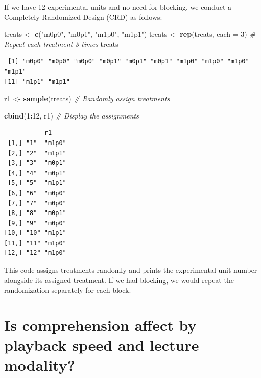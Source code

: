 \documentclass[
  letterpaper,
]{book}
\newenvironment{Shaded}{\begin{snugshade}}{\end{snugshade}}
\newcommand{\AttributeTok}[1]{\textcolor[rgb]{0.13,0.29,0.53}{#1}}
\newcommand{\CommentTok}[1]{\textcolor[rgb]{0.56,0.35,0.01}{\textit{#1}}}
\newcommand{\DecValTok}[1]{\textcolor[rgb]{0.00,0.00,0.81}{#1}}
\newcommand{\FunctionTok}[1]{\textcolor[rgb]{0.13,0.29,0.53}{\textbf{#1}}}
\newcommand{\NormalTok}[1]{#1}
\newcommand{\OtherTok}[1]{\textcolor[rgb]{0.56,0.35,0.01}{#1}}
\newcommand{\SpecialCharTok}[1]{\textcolor[rgb]{0.81,0.36,0.00}{\textbf{#1}}}
\newcommand{\StringTok}[1]{\textcolor[rgb]{0.31,0.60,0.02}{#1}}
\begin{document}
If we have 12 experimental units and no need for blocking, we conduct a
Completely Randomized Design (CRD) as follows:

\begin{Shaded}
\begin{Highlighting}[]
\NormalTok{treats }\OtherTok{\textless{}{-}} \FunctionTok{c}\NormalTok{(}\StringTok{"m0p0"}\NormalTok{, }\StringTok{"m0p1"}\NormalTok{, }\StringTok{"m1p0"}\NormalTok{, }\StringTok{"m1p1"}\NormalTok{)}
\NormalTok{treats }\OtherTok{\textless{}{-}} \FunctionTok{rep}\NormalTok{(treats, }\AttributeTok{each =} \DecValTok{3}\NormalTok{)  }\CommentTok{\# Repeat each treatment 3 times}
\NormalTok{treats }
\end{Highlighting}
\end{Shaded}

\begin{verbatim}
 [1] "m0p0" "m0p0" "m0p0" "m0p1" "m0p1" "m0p1" "m1p0" "m1p0" "m1p0" "m1p1"
[11] "m1p1" "m1p1"
\end{verbatim}

\begin{Shaded}
\begin{Highlighting}[]
\NormalTok{r1 }\OtherTok{\textless{}{-}} \FunctionTok{sample}\NormalTok{(treats)  }\CommentTok{\# Randomly assign treatments}

\FunctionTok{cbind}\NormalTok{(}\DecValTok{1}\SpecialCharTok{:}\DecValTok{12}\NormalTok{, r1)  }\CommentTok{\# Display the assignments}
\end{Highlighting}
\end{Shaded}

\begin{verbatim}
           r1    
 [1,] "1"  "m1p0"
 [2,] "2"  "m1p1"
 [3,] "3"  "m0p1"
 [4,] "4"  "m0p1"
 [5,] "5"  "m1p1"
 [6,] "6"  "m0p0"
 [7,] "7"  "m0p0"
 [8,] "8"  "m0p1"
 [9,] "9"  "m0p0"
[10,] "10" "m1p1"
[11,] "11" "m1p0"
[12,] "12" "m1p0"
\end{verbatim}

This code assigns treatments randomly and prints the experimental unit
number alongside its assigned treatment. If we had blocking, we would
repeat the randomization separately for each block.

\section{Is comprehension affect by playback speed and lecture
modality?}\label{is-comprehension-affect-by-playback-speed-and-lecture-modality}
\end{document}

